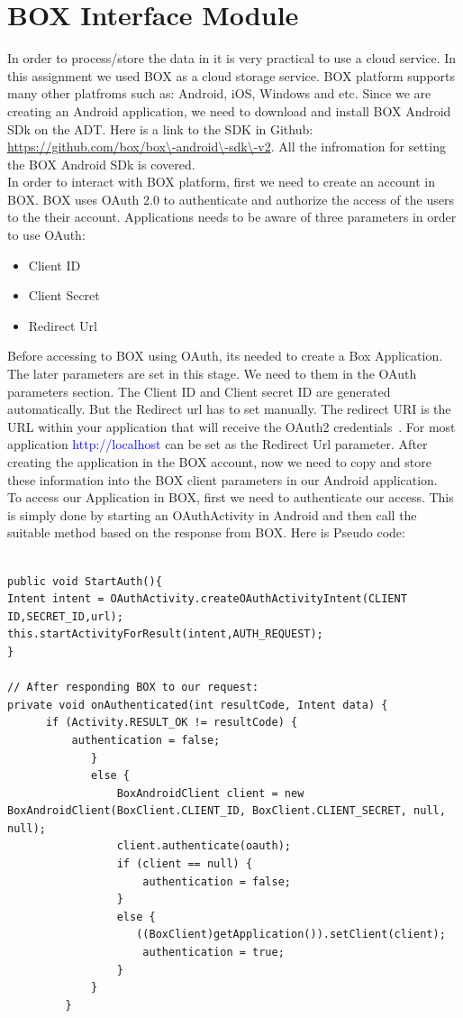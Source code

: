 \documentclass[conference]{IEEEtran}
\begin{document}
\section{BOX Interface Module}
In order to process/store the data in it is very practical to use a cloud service. In this assignment we used BOX as a cloud storage service. BOX platform supports many other platfroms such as: Android, iOS, Windows and etc. Since we are creating an Android application, we need to download and install BOX Android SDk on the ADT. Here is a link to the SDK in Github:\\\url{https://github.com/box/box\-android\-sdk\-v2}. All the infromation for setting the BOX Android SDk is covered.\\
 In order to interact with BOX platform, first we need to create an account in BOX. BOX uses OAuth 2.0 to authenticate and authorize the access of the users to the their account. Applications needs to be aware of three parameters in order to use OAuth:
\begin{itemize}[h]
  \item Client ID
  \item Client Secret
  \item Redirect Url
\end{itemize}
Before accessing to BOX using OAuth, its needed to create a Box Application. The later parameters are set in this stage. We need to them in the OAuth parameters section. The Client ID and Client secret ID are generated automatically. But the Redirect url has to set manually. The redirect URI is the URL within your application that will receive the OAuth2 credentials~\cite{BoxAppRef}. For most application \textcolor{blue}{http://localhost} can be set as the Redirect Url parameter. After creating the application in the BOX account, now we need to copy and store these information into the BOX client parameters in our Android application.\\
To access our Application in BOX, first we need to authenticate our access. This is simply done by starting an OAuthActivity in Android and then call the suitable method based on the response from BOX. Here is Pseudo code:
\begin{lstlisting}

public void StartAuth(){
Intent intent = OAuthActivity.createOAuthActivityIntent(CLIENT ID,SECRET_ID,url);
this.startActivityForResult(intent,AUTH_REQUEST); 				
}

// After responding BOX to our request:
private void onAuthenticated(int resultCode, Intent data) {
      if (Activity.RESULT_OK != resultCode) {
          authentication = false;
	         }
	         else {
	             BoxAndroidClient client = new BoxAndroidClient(BoxClient.CLIENT_ID, BoxClient.CLIENT_SECRET, null, null);
	             client.authenticate(oauth);
	             if (client == null) {
	                 authentication = false;
	             }
	             else {
	             	((BoxClient)getApplication()).setClient(client);
	                 authentication = true;
	             }
	         }
	     }
\end{lstlisting}
\end{document}
